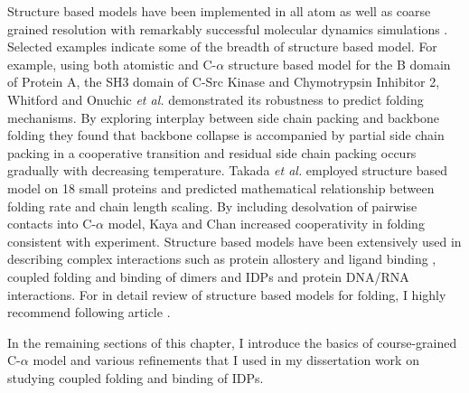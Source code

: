 \documentclass[../talant.diss.submit.tex]{subfiles}
\begin{document}

Structure based models have been implemented in all atom as well as
coarse grained resolution with remarkably successful molecular dynamics simulations
\cite{Clementi:00a,chavez:04,levy:04,whitford:09,zheng:12p,yao:15n,cho:09,marcovitz:09}.
Selected examples indicate some of the breadth
of structure based model. 
For example, using both atomistic and C-$\alpha$ structure based model for the B domain of Protein A,
the SH3 domain of C-Src Kinase and Chymotrypsin Inhibitor 2, Whitford and Onuchic
\textit{et al.} demonstrated its robustness to predict folding mechanisms.
By exploring
interplay between side chain packing and backbone folding they found that backbone collapse
is accompanied by partial side chain packing in a cooperative transition and residual side chain
packing occurs gradually with decreasing temperature\cite{whitford:09}. Takada \textit{et al.}
employed structure based model on 18 small proteins and predicted mathematical relationship
between folding rate and chain length scaling\cite{koga:01}. By including desolvation
of pairwise contacts into C-$\alpha$ model, Kaya and Chan increased cooperativity in folding
\cite{kaya:03} consistent with experiment.
Structure based models have been extensively used in describing complex interactions such as
protein allostery and ligand binding
\cite{chen:07,knott:14,okazaki:08,nandigrami:16compa,nandigrami:16coarse},
coupled folding and binding of dimers and IDPs\cite{levy:04,levy:05,turjanski:08,cao:16,huang:10a}
and protein DNA/RNA interactions\cite{vuzman:10d,khazanov:11s,trizac:10,marcovitz:09}.
For in detail review of structure based models for folding, I highly recommend following
article \cite{noel:12}.

In the remaining sections of this chapter, I introduce the basics of
course-grained C-$\alpha$ model and various refinements that I used in my
dissertation work on studying coupled folding and binding of IDPs.
\end{document}

